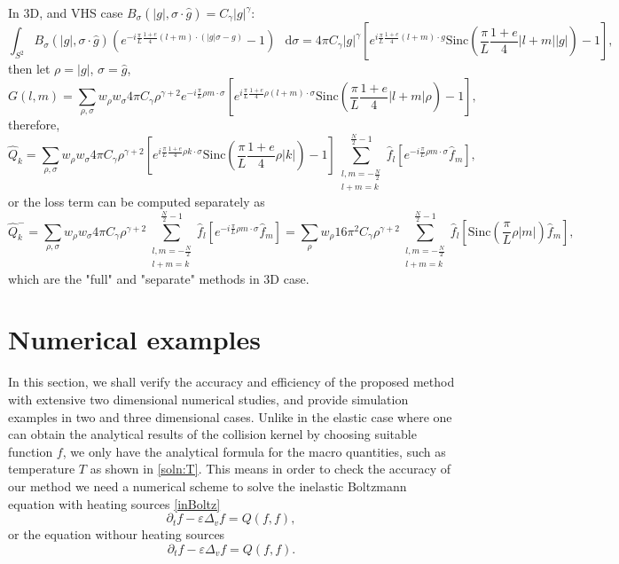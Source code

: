 \documentclass[review, times]{elsarticle}
\newcommand*\diff{\mathop{}\!\mathrm{d}}
\begin{document}
In 3D, and VHS case $B_{\sigma}(|g|,\sigma\cdot \hat{g})=C_{\gamma}|g|^{\gamma}$:
\begin{equation}
\int_{S^2}B_{\sigma}(|g|,\sigma\cdot \hat{g})\left(e^{-i\frac{\pi}{L}\frac{1+e}{4}(l+m)\cdot (|g|\sigma-g)}-1\right)\,\diff{\sigma}=4\pi C_{\gamma}|g|^{\gamma}\left[ e^{i\frac{\pi}{L}\frac{1+e}{4}(l+m)\cdot g}\text{Sinc}\left(\frac{\pi}{L}\frac{1+e}{4}|l+m||g|\right)-1\right],
\end{equation}
then let $\rho=|g|$, $\sigma=\hat{g}$,
\begin{equation}
G(l,m)=\sum_{\rho,\sigma}w_{\rho}w_{\sigma}4\pi C_{\gamma}\rho^{\gamma+2}e^{-i\frac{\pi}{L}\rho m \cdot \sigma}\left[ e^{i\frac{\pi}{L}\frac{1+e}{4}\rho (l+m)\cdot \sigma}\text{Sinc}\left(\frac{\pi}{L}\frac{1+e}{4}|l+m|\rho\right)-1\right],
\end{equation}
therefore,
\begin{equation} 
\hat{Q}_k=\sum_{\rho,\sigma}w_{\rho}w_{\sigma}4\pi C_{\gamma}\rho^{\gamma+2}\left[ e^{i\frac{\pi}{L}\frac{1+e}{4}\rho k\cdot \sigma}\text{Sinc}\left(\frac{\pi}{L}\frac{1+e}{4}\rho |k|\right)-1\right]\sum_{\substack{l,m=-\frac{N}{2}\\l+m=k}}^{\frac{N}{2}-1}\hat{f}_l \left[e^{-i\frac{\pi}{L}\rho m \cdot \sigma}\hat{f}_m\right],
\end{equation} 
or the loss term can be computed separately as
\begin{equation} 
\hat{Q}_k^-=\sum_{\rho,\sigma}w_{\rho}w_{\sigma}4\pi C_{\gamma}\rho^{\gamma+2}\sum_{\substack{l,m=-\frac{N}{2}\\l+m=k}}^{\frac{N}{2}-1}\hat{f}_l \left[e^{-i\frac{\pi}{L}\rho m \cdot \sigma}\hat{f}_m\right]=\sum_{\rho}w_{\rho}16\pi^2 C_{\gamma}\rho^{\gamma+2}\sum_{\substack{l,m=-\frac{N}{2}\\l+m=k}}^{\frac{N}{2}-1}\hat{f}_l \left[\text{Sinc}\left(\frac{\pi}{L}\rho |m|\right)\hat{f}_m\right],
\end{equation}
which are the "full" and "separate" methods in 3D case.

\section{Numerical examples}

In this section, we shall verify the accuracy and efficiency of the proposed method with extensive two dimensional numerical studies, and provide simulation examples in two and three dimensional cases. Unlike in the elastic case where one can obtain the analytical results of the collision kernel by choosing suitable function $f$, we only have the analytical formula for the macro quantities, such as temperature $T$ as shown in \eqref{soln:T}. This means in order to check the accuracy of our method we need a numerical scheme to solve the inelastic Boltzmann equation with heating sources \eqref{inBoltz}
\begin{equation*}
  \partial_t f-\varepsilon \Delta_vf=Q(f,f),
\end{equation*}
or the equation withour heating sources
\begin{equation}
  \partial_t f - \varepsilon \Delta_vf = Q(f, f).
\end{equation}
\end{document}
